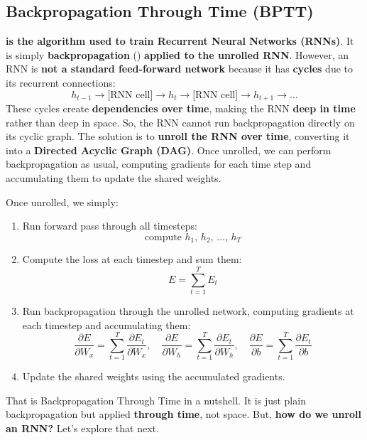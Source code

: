 \subsection{Backpropagation Through Time (BPTT)}

 \textbf{is the algorithm used to train Recurrent Neural Networks (RNNs)}. It is simply \textbf{backpropagation} () \textbf{applied to the unrolled RNN}. However, an RNN is \textbf{not a standard feed-forward network} because it has \textbf{cycles} due to its recurrent connections:
\begin{equation*}
    h_{t-1} \rightarrow \text{[RNN cell]} \rightarrow h_{t} \rightarrow \text{[RNN cell]} \rightarrow h_{t+1} \rightarrow \ldots
\end{equation*}
These cycles create \textbf{dependencies over time}, making the RNN \textbf{deep in time} rather than deep in space. So, the RNN cannot run backpropagation directly on its cyclic graph. The solution is to \textbf{unroll the RNN over time}, converting it into a \textbf{Directed Acyclic Graph (DAG)}. Once unrolled, we can perform backpropagation as usual, computing gradients for each time step and accumulating them to update the shared weights.

\highspace
Once unrolled, we simply:
\begin{enumerate}
    \item Run forward pass through all timesteps:
    \begin{equation*}
        \text{compute } h_1, \, h_2, \, \ldots, \, h_T
    \end{equation*}
    \item Compute the loss at each timestep and sum them:
    \begin{equation*}
        E = \sum_{t=1}^{T} E_t
    \end{equation*}
    \item Run backpropagation through the unrolled network, computing gradients at each timestep and accumulating them:
    \begin{equation*}
        \frac{\partial E}{\partial W_x} = \sum_{t=1}^{T} \frac{\partial E_t}{\partial W_x}, \quad
        \frac{\partial E}{\partial W_h} = \sum_{t=1}^{T} \frac{\partial E_t}{\partial W_h}, \quad
        \frac{\partial E}{\partial b} = \sum_{t=1}^{T} \frac{\partial E_t}{\partial b}
    \end{equation*}
    \item Update the shared weights using the accumulated gradients.
\end{enumerate}
That is Backpropagation Through Time in a nutshell. It is just plain backpropagation but applied \textbf{through time}, not space. But, \textbf{how do we unroll an RNN?} Let's explore that next.

